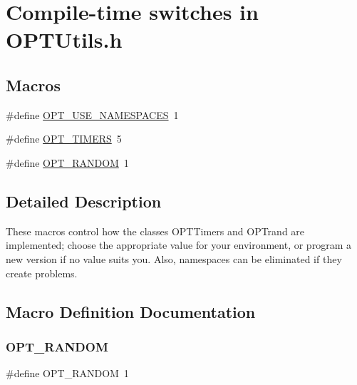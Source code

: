 \hypertarget{group___o_p_t_u_t_i_l_s___m_a_c_r_o_s}{}\section{Compile-\/time switches in O\+P\+T\+Utils.\+h}
\label{group___o_p_t_u_t_i_l_s___m_a_c_r_o_s}
\subsection*{Macros}
\begin{DoxyCompactItemize}
\item 
\#define \mbox{\hyperlink{group___o_p_t_u_t_i_l_s___m_a_c_r_o_s_ga677c6af9167727c62f3c54e63b5d301c}{O\+P\+T\+\_\+\+U\+S\+E\+\_\+\+N\+A\+M\+E\+S\+P\+A\+C\+ES}}~1
\item 
\#define \mbox{\hyperlink{group___o_p_t_u_t_i_l_s___m_a_c_r_o_s_gaf6f82b9aa17f7142fce27b3b495eadb9}{O\+P\+T\+\_\+\+T\+I\+M\+E\+RS}}~5
\item 
\#define \mbox{\hyperlink{group___o_p_t_u_t_i_l_s___m_a_c_r_o_s_ga4b01b5907db0c62e6be96dda04981677}{O\+P\+T\+\_\+\+R\+A\+N\+D\+OM}}~1
\end{DoxyCompactItemize}


\subsection{Detailed Description}
These macros control how the classes O\+P\+T\+Timers and O\+P\+Trand are implemented; choose the appropriate value for your environment, or program a new version if no value suits you. Also, namespaces can be eliminated if they create problems. 

\subsection{Macro Definition Documentation}
\mbox{\label{group___o_p_t_u_t_i_l_s___m_a_c_r_o_s_ga4b01b5907db0c62e6be96dda04981677}} 
\subsubsection{\texorpdfstring{O\+P\+T\+\_\+\+R\+A\+N\+D\+OM}{OPT\_RANDOM}}
{\footnotesize\ttfamily \#define O\+P\+T\+\_\+\+R\+A\+N\+D\+OM~1}

